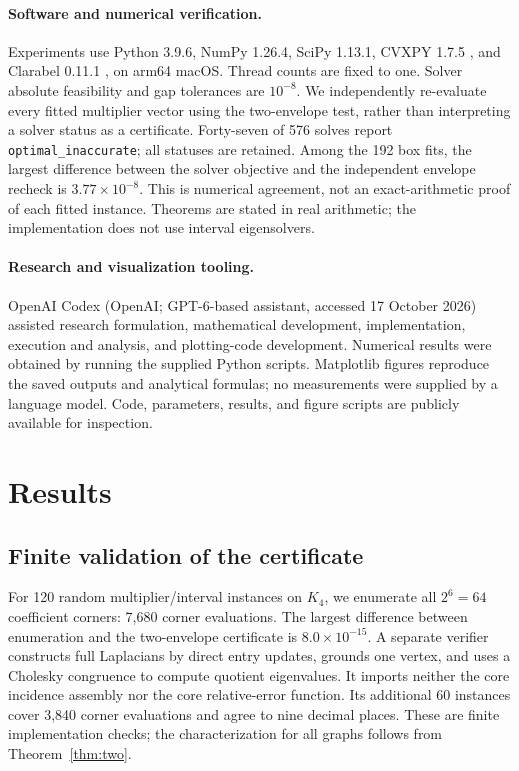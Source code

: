 \documentclass[11pt]{article}
\begin{document}
\paragraph{Software and numerical verification.}
Experiments use Python 3.9.6, NumPy 1.26.4, SciPy 1.13.1, CVXPY 1.7.5 \cite{cvxpy}, and Clarabel 0.11.1 \cite{clarabel}, on arm64 macOS. Thread counts are fixed to one. Solver absolute feasibility and gap tolerances are $10^{-8}$. We independently re-evaluate every fitted multiplier vector using the two-envelope test, rather than interpreting a solver status as a certificate. Forty-seven of 576 solves report \texttt{optimal\_inaccurate}; all statuses are retained. Among the 192 box fits, the largest difference between the solver objective and the independent envelope recheck is $3.77\times10^{-8}$. This is numerical agreement, not an exact-arithmetic proof of each fitted instance. Theorems are stated in real arithmetic; the implementation does not use interval eigensolvers.

\paragraph{Research and visualization tooling.}
OpenAI Codex (OpenAI; GPT-6-based assistant, accessed 17 October 2026) assisted research formulation, mathematical development, implementation, execution and analysis, and plotting-code development. Numerical results were obtained by running the supplied Python scripts. Matplotlib figures reproduce the saved outputs and analytical formulas; no measurements were supplied by a language model. Code, parameters, results, and figure scripts are publicly available for inspection.

\section{Results}
\subsection{Finite validation of the certificate}
For 120 random multiplier/interval instances on $K_4$, we enumerate all $2^6=64$ coefficient corners: 7,680 corner evaluations. The largest difference between enumeration and the two-envelope certificate is $8.0\times10^{-15}$. A separate verifier constructs full Laplacians by direct entry updates, grounds one vertex, and uses a Cholesky congruence to compute quotient eigenvalues. It imports neither the core incidence assembly nor the core relative-error function. Its additional 60 instances cover 3,840 corner evaluations and agree to nine decimal places. These are finite implementation checks; the characterization for all graphs follows from Theorem~\ref{thm:two}.
\end{document}
